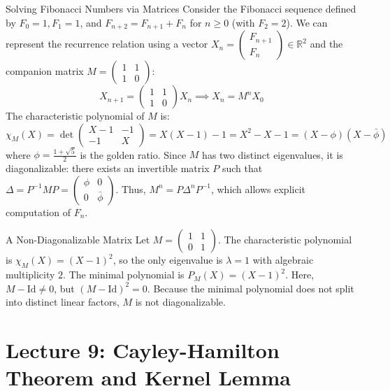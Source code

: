 \documentclass[11pt, a4paper]{article}
\newcommand{\R}{\mathbb{R}}
\begin{document}
\begin{example}{Solving Fibonacci Numbers via Matrices}{}
Consider the Fibonacci sequence defined by $F_0 = 1, F_1 = 1$, and $F_{n+2} = F_{n+1} + F_n$ for $n \ge 0$ (with $F_2 = 2$).
We can represent the recurrence relation using a vector $X_n = \begin{pmatrix} F_{n+1} \\ F_n \end{pmatrix} \in \R^2$ and the companion matrix $M = \begin{pmatrix} 1 & 1 \\ 1 & 0 \end{pmatrix}$:
$$ X_{n+1} = \begin{pmatrix} 1 & 1 \\ 1 & 0 \end{pmatrix} X_n \implies X_n = M^n X_0 $$ %
The characteristic polynomial of $M$ is:
$$ \chi_M(X) = \det \begin{pmatrix} X - 1 & -1 \\ -1 & X \end{pmatrix} = X(X-1) - 1 = X^2 - X - 1 = (X - \phi)(X - \bar{\phi}) $$ %
where $\phi = \frac{1+\sqrt{5}}{2}$ is the golden ratio.
Since $M$ has two distinct eigenvalues, it is diagonalizable: there exists an invertible matrix $P$ such that $\Delta = P^{-1}MP = \begin{pmatrix} \phi & 0 \\ 0 & \bar{\phi} \end{pmatrix}$.
Thus, $M^n = P \Delta^n P^{-1}$, which allows explicit computation of $F_n$.
\end{example}

\begin{example}{A Non-Diagonalizable Matrix}{}
Let $M = \begin{pmatrix} 1 & 1 \\ 0 & 1 \end{pmatrix}$.
The characteristic polynomial is $\chi_M(X) = (X-1)^2$, so the only eigenvalue is $\lambda = 1$ with algebraic multiplicity $2$.
The minimal polynomial is $P_M(X) = (X-1)^2$.
Here, $M - \text{Id} \neq 0$, but $(M - \text{Id})^2 = 0$. Because the minimal polynomial does not split into distinct linear factors, $M$ is not diagonalizable.
\end{example}

\section{Lecture 9: Cayley-Hamilton Theorem and Kernel Lemma}
\end{document}
